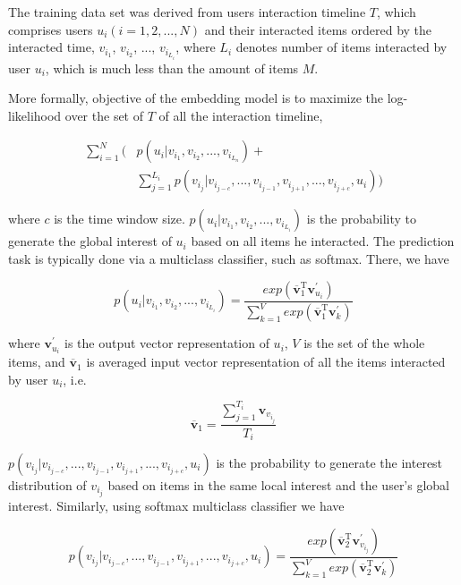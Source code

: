 \documentclass{sig-alternate-05-2015}
\begin{document}
The training data set was derived from users interaction timeline $T$,
which comprises users $u_i (i=1,2,...,N)$ and their interacted items ordered by the interacted time,
$v_{i_1}$, $v_{i_2}$, ..., $v_{i_{L_i}}$,
where $L_i$ denotes number of items interacted by user $u_i$,
which is much less than the amount of items $M$.

More formally, objective of the embedding model is to
maximize the log-likelihood over the set of $T$ of all the interaction timeline,

\begin{equation}
\begin{aligned}
	\sum_{i=1}^{N} \bigg( &p(u_i | v_{i_1}, v_{i_2}, ..., v_{i_{L_n}}) + \\
	                      &\sum_{j=1}^{L_i} p(v_{i_j} | v_{i_{j-c}}, ..., v_{i_{j-1}}, v_{i_{j+1}},..., v_{i_{j+c}}, u_i) \bigg)
\end{aligned}
\end{equation}

where $c$ is the time window size.
$p(u_i | v_{i_1}, v_{i_2}, ..., v_{i_{L_i}})$ is the probability to generate
the global interest of $u_i$ based on all items he interacted.
The prediction task is typically done via a multiclass classifier,
such as softmax. There, we have

\begin{equation}
	p(u_i | v_{i_1}, v_{i_2}, ..., v_{i_{L_i}}) =
	\frac
	{
		exp ( \overline{\mathbf{v}}_{1}^{\mathrm{T}} \mathbf{v}_{u_i}^{'} )
	}
	{
		\sum_{k=1}^{V} exp ( \overline{\mathbf{v}}_{1}^{\mathrm{T}} \mathbf{v}_{k}^{'} )
	}
\end{equation}

where $\mathbf{v}_{u_i}^{'}$ is the output vector representation of $u_i$,
$V$ is the set of the whole items,
and $\overline{\mathbf{v}}_{1}$ is averaged input vector representation of all the items
interacted by user $u_i$, i.e.

\begin{equation}
	\overline{\mathbf{v}}_{1} = \frac{\sum_{j=1}^{T_i} \mathbf{v}_{v_{i_j}}}{T_i}
\end{equation}

$p(v_{i_j} | v_{i_{j-c}}, ..., v_{i_{j-1}}, v_{i_{j+1}},..., v_{i_{j+c}}, u_i)$
is the probability to generate the interest distribution of $v_{i_j}$
based on items in the same local interest and the user's global interest.
Similarly, using softmax multiclass classifier we have

\begin{equation}
	p(v_{i_j} | v_{i_{j-c}}, ..., v_{i_{j-1}}, v_{i_{j+1}},..., v_{i_{j+c}}, u_i) =
	\frac
	{
		exp( \overline{\mathbf{v}}_{2}^{\mathrm{T}} \mathbf{v}_{v_{i_j}}^{'} )
	}
	{
		\sum_{k=1}^{V} exp( \overline{\mathbf{v}}_{2}^{\mathrm{T}} \mathbf{v}_{k}^{'} )
	}
\end{equation}
\end{document}

